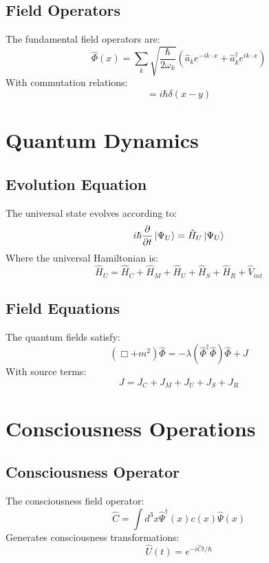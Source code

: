 \documentclass[12pt]{article}
\begin{document}
\subsection{Field Operators}
The fundamental field operators are:
\begin{equation}
\hat{\Phi}(x) = \sum_k \sqrt{\frac{\hbar}{2\omega_k}}(\hat{a}_k e^{-ik\cdot x} + \hat{a}_k^\dagger e^{ik\cdot x})
\end{equation}
With commutation relations:
\begin{equation}
[\hat{\Phi}(x),\hat{\Pi}(y)] = i\hbar\delta(x-y)
\end{equation}
\section{Quantum Dynamics}
\subsection{Evolution Equation}
The universal state evolves according to:
\begin{equation}
i\hbar\frac{\partial}{\partial t}\ket{\Psi_U} = \hat{H}_U\ket{\Psi_U}
\end{equation}
Where the universal Hamiltonian is:
\begin{equation}
\hat{H}_U = \hat{H}_C + \hat{H}_M + \hat{H}_U + \hat{H}_S + \hat{H}_R + \hat{V}_{int}
\end{equation}
\subsection{Field Equations}
The quantum fields satisfy:
\begin{equation}
(\Box + m^2)\hat{\Phi} = -\lambda(\hat{\Phi}^\dagger\hat{\Phi})\hat{\Phi} + J
\end{equation}
With source terms:
\begin{equation}
J = J_C + J_M + J_U + J_S + J_R
\end{equation}
\section{Consciousness Operations}
\subsection{Consciousness Operator}
The consciousness field operator:
\begin{equation}
\hat{C} = \int d^3x \hat{\Psi}^\dagger(x)c(x)\hat{\Psi}(x)
\end{equation}
Generates consciousness transformations:
\begin{equation}
\hat{U}(t) = e^{-i\hat{C}t/\hbar}
\end{equation}
\end{document}
